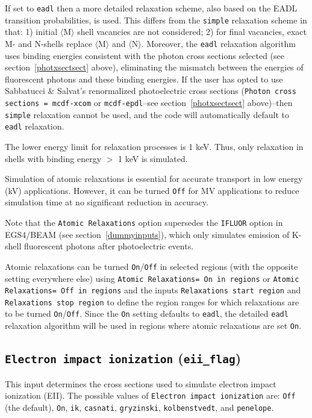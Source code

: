 \documentclass[12pt,twoside]{article}
\begin{document}
If set to {\tt eadl} then a more detailed relaxation scheme, also based on the
EADL transition probabilities, is used.  This differs from the {\tt simple}
relaxation scheme in that: 1) initial $\langle$M$\rangle$ shell vacancies are
not considered; 2) for final vacancies, exact M- and N-shells replace
$\langle$M$\rangle$ and $\langle$N$\rangle$.  Moreover, the {\tt eadl}
relaxation algorithm uses binding energies consistent with the photon cross
sections selected (see section~\ref{photxsectsect} above), eliminating the
mismatch between the energies of fluorescent photons and these binding energies.
If the user has opted to use Sabbatucci \& Salvat's renormalized photoelectric
cross sections ({\tt Photon cross sections = mcdf-xcom} or {\tt mcdf-epdl}--see
section~\ref{photxsectsect} above)--then {\tt simple} relaxation cannot be used,
and the code will automatically default to {\tt eadl} relaxation.

The lower energy limit for relaxation processes
is 1 keV.  Thus, only relaxation in shells with binding energy $>$ 1 keV is
simulated.

Simulation of atomic relaxations is essential for accurate transport in low
energy (kV) applications.  However, it can be turned {\tt Off} for MV
applications to reduce simulation time at no significant reduction in accuracy.

Note that
the {\tt Atomic Relaxations} option supersedes the {\tt IFLUOR} option
in EGS4/BEAM (see section~\ref{dummyinputs}), which only simulates
emission of
K-shell fluorescent photons after photoelectric events.

Atomic relaxations can be turned {\tt On}/{\tt Off} in
selected regions (with the opposite setting everywhere else) using
{\tt Atomic Relaxations= On in regions} or
{\tt Atomic Relaxations= Off in regions} and the inputs
{\tt Relaxations start region} and {\tt Relaxations stop region} to define
the region ranges for which relaxations are to be turned {\tt On}/{\tt Off}.
Since the {\tt On} setting defaults to {\tt eadl}, the detailed {\tt eadl}
relaxation algorithm will be used in regions where atomic relaxations are set
{\tt On}.

\subsection{ {\tt Electron impact ionization} ({\tt eii\_flag})}

This input determines the cross sections used to simulate electron impact
ionization (EII). The possible values of {\tt Electron impact ionization} are:
{\tt Off} (the default), {\tt On}, {\tt ik}, {\tt casnati}, {\tt gryzinski},
{\tt kolbenstvedt}, and {\tt penelope}.
\end{document}
